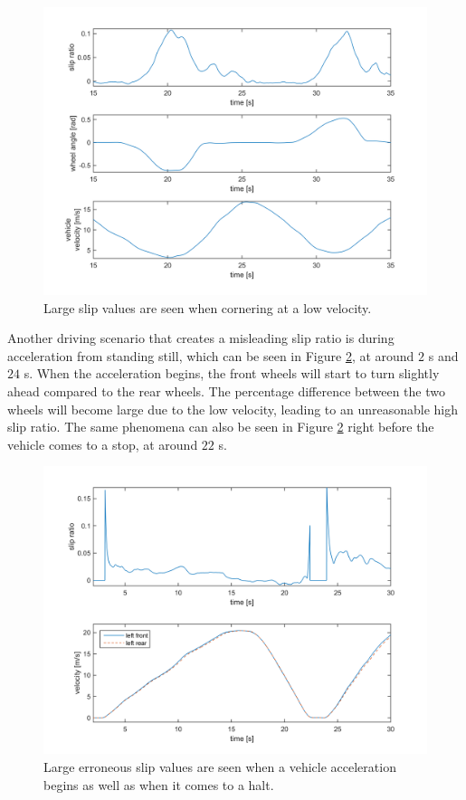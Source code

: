 \begin{figure}[h]
	\centering
	\includegraphics[width=1.0\textwidth]{Pictures/turning_slow_Vx}
	\caption {Large slip values are seen when cornering at a low velocity.}
	\label{turning_slow_Vx}
\end{figure}

Another driving scenario that creates a misleading slip ratio is during acceleration from standing still, which can be seen in Figure \ref{slipratio_from_still}, at around $ 2 $ s and $ 24 $ s. When the acceleration begins, the front wheels will start to turn slightly ahead compared to the rear wheels. The percentage difference between the two wheels will become large due to the low velocity, leading to an unreasonable high slip ratio. The same phenomena can also be seen in Figure \ref{slipratio_from_still} right before the vehicle comes to a stop, at around $ 22 $ s. 

\begin{figure}[h]
	\centering
	\includegraphics[width=1.0\textwidth]{Pictures/slipratio_from_still}
	\caption {Large erroneous slip values are seen when a vehicle acceleration begins as well as when it comes to a halt.}
	\label{slipratio_from_still}
\end{figure}


